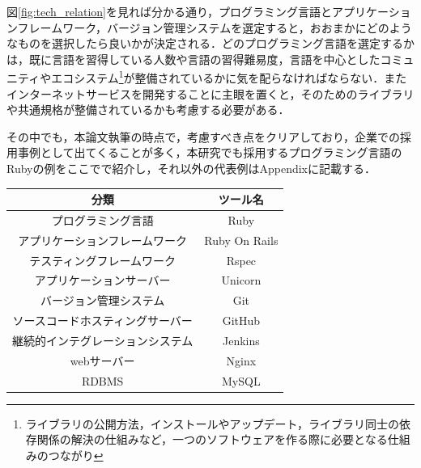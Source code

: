 図\ref{fig:tech_relation}を見れば分かる通り，プログラミング言語とアプリケーションフレームワーク，バージョン管理システムを選定すると，おおまかにどのようなものを選択したら良いかが決定される．どのプログラミング言語を選定するかは，既に言語を習得している人数や言語の習得難易度，言語を中心としたコミュニティやエコシステム\footnote{ライブラリの公開方法，インストールやアップデート，ライブラリ同士の依存関係の解決の仕組みなど，一つのソフトウェアを作る際に必要となる仕組みのつながり}が整備されているかに気を配らなければならない．またインターネットサービスを開発することに主眼を置くと，そのためのライブラリや共通規格が整備されているかも考慮する必要がある．

その中でも，本論文執筆の時点で，考慮すべき点をクリアしており，企業での採用事例として出てくることが多く，本研究でも採用するプログラミング言語のRubyの例をここでで紹介し，それ以外の代表例はAppendixに記載する．

\begin{table}[ht]
  \begin{center}
    \begin{tabular}{|c|c|}
      \hline
      分類 & ツール名 \\
      \hline
      プログラミング言語 & Ruby \\
      \hline
      アプリケーションフレームワーク& Ruby On Rails\\
      \hline
      テスティングフレームワーク & Rspec \\
      \hline
      アプリケーションサーバー & Unicorn \\
      \hline
      バージョン管理システム & Git \\
      \hline
      ソースコードホスティングサーバー & GitHub \\
      \hline
      継続的インテグレーションシステム & Jenkins \\
      \hline
      webサーバー & Nginx \\
      \hline
      RDBMS & MySQL \\
      \hline
    \end{tabular}
  \end{center}
\end{table}
